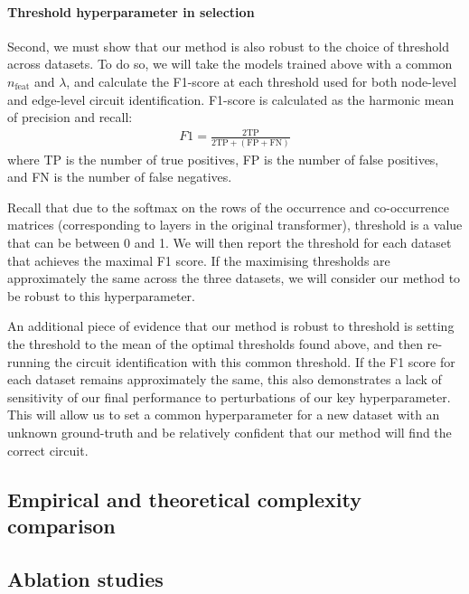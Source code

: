 \documentclass[11pt]{scrartcl}
\begin{document}
\paragraph{Threshold hyperparameter in selection}
Second, we must show that our method is also robust to the choice of threshold across datasets. To do so, we will take the models trained above with a common $n_\text{feat}$ and $\lambda$, and calculate the F1-score at each threshold used for both node-level and edge-level circuit identification. F1-score is calculated as the harmonic mean of precision and recall:
\begin{align*}
F1 = \frac{2\text{TP}}{2\text{TP} + (\text{FP} + \text{FN})}
\end{align*}
where TP is the number of true positives, FP is the number of false positives, and FN is the number of false negatives.

Recall that due to the softmax on the rows of the occurrence and co-occurrence matrices (corresponding to layers in the original transformer), threshold is a value that can be between 0 and 1. We will then report the threshold for each dataset that achieves the maximal F1 score. If the maximising thresholds are approximately the same across the three datasets, we will consider our method to be robust to this hyperparameter.

An additional piece of evidence that our method is robust to threshold is setting the threshold to the mean of the optimal thresholds found above, and then re-running the circuit identification with this common threshold. If the F1 score for each dataset remains approximately the same, this also demonstrates a lack of sensitivity of our final performance to perturbations of our key hyperparameter. This will allow us to set a common hyperparameter for a new dataset with an unknown ground-truth and be relatively confident that our method will find the correct circuit.

\subsection{Empirical and theoretical complexity comparison}



\subsection{Ablation studies}
\end{document}
